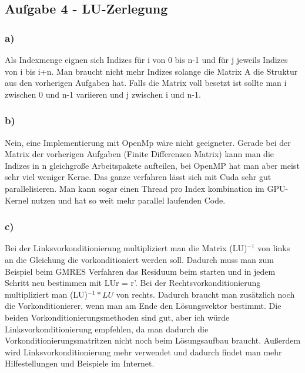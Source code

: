 \documentclass{report}
\begin{document}
\subsection{Aufgabe 4 - LU-Zerlegung}

\subsubsection{a)}
Als Indexmenge eignen sich Indizes für i von 0 bis n-1 und für j jeweils Indizes von i bis i+n. Man braucht nicht mehr Indizes solange die Matrix A die Struktur aus den vorherigen Aufgaben hat. Falls die Matrix voll besetzt ist sollte man i zwischen 0 und n-1 variieren und j zwischen i und n-1.

\subsubsection{b)}
Nein, eine Implementierung mit OpenMp wäre nicht geeigneter. Gerade bei der Matrix der vorherigen Aufgaben (Finite Differenzen Matrix) kann man die Indizes in n gleichgroße Arbeitspakete aufteilen, bei OpenMP hat man aber meist sehr viel weniger Kerne. Das ganze verfahren lässt sich mit Cuda sehr gut parallelisieren. Man kann sogar einen Thread pro Index kombination im GPU-Kernel nutzen und hat so weit mehr parallel laufenden Code.

\subsubsection{c)}
Bei der Linksvorkonditionierung multipliziert man die Matrix (LU)$^{-1}$ von links an die Gleichung die vorkonditioniert werden soll. Dadurch muss man zum Beispiel beim GMRES Verfahren das Residuum beim starten und in jedem Schritt neu bestimmen mit LUr = r'. Bei der Rechtsvorkonditionierung multipliziert man (LU)$^{-1}*LU$ von rechts. Dadurch braucht man zusätzlich noch die Vorkonditionierer, wenn man am Ende den Lösungsvektor bestimmt. 
Die beiden Vorkonditionierungsmethoden sind gut, aber ich würde Linksvorkonditionierung empfehlen, da man dadurch die Vorkonditionierungsmatritzen nicht noch beim Lösungsaufbau braucht. Außerdem wird Linksvorkonditionierung mehr verwendet und dadurch findet man mehr Hilfestellungen und Beispiele im Internet.
\end{document}
